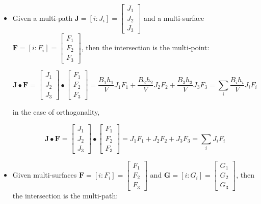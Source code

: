\documentclass{book}
\begin{document}
\begin{itemize}
\item Given a multi-path \(\mathbf{J} = [i : J_i] = \begin{bmatrix} J_1 \\ J_2 \\ J_3 \end{bmatrix}\) and a multi-surface \(\mathbf{F} = [i : F_i] = \begin{bmatrix} F_1 \\ F_2 \\ F_3 \end{bmatrix}\), then the intersection is the multi-point:

\[\mathbf{J} \bullet \mathbf{F} = \begin{bmatrix} J_1 \\ J_2 \\ J_3 \end{bmatrix} \bullet \begin{bmatrix} F_1 \\ F_2 \\ F_3 \end{bmatrix} = \frac{B_1 h_1}{V} J_1 F_1 + \frac{B_2 h_2}{V} J_2 F_2 + \frac{B_3 h_3}{V} J_3 F_3 = \sum_i \frac{B_i h_i}{V} J_i F_i\]

in the case of orthogonality,

\[\mathbf{J} \bullet \mathbf{F} = \begin{bmatrix} J_1 \\ J_2 \\ J_3 \end{bmatrix} \bullet \begin{bmatrix} F_1 \\ F_2 \\ F_3 \end{bmatrix} = J_1 F_1 + J_2 F_2 + J_3 F_3 = \sum_i J_i F_i\]


\item Given multi-surfaces \(\mathbf{F} = [i : F_i] = \begin{bmatrix} F_1 \\ F_2 \\ F_3 \end{bmatrix}\) and \(\mathbf{G} = [i : G_i] = \begin{bmatrix} G_1 \\ G_2 \\ G_3 \end{bmatrix}\), then the intersection is the multi-path:


\end{itemize}
\end{document}
